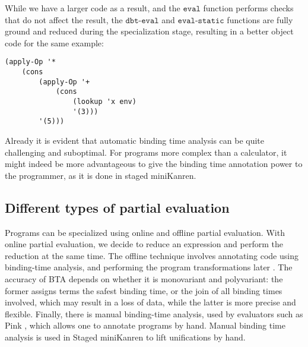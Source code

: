 \documentclass[11pt]{article}
\theoremstyle{definition}
\newcommand{\code}[1]{\texttt{#1}}
\newcommand\tab[1][1cm]{\hspace*{#1}}
\begin{document}
\tab While we have a larger code as a result, and the $\code{eval}$ function performs checks that do not affect the result, the $\code{dbt-eval}$ and $\code{eval-static}$ functions are fully ground and reduced during the specialization stage, resulting in a better object code for the same example:
\begin{lstlisting}
(apply-Op '*
    (cons
        (apply-Op '+
            (cons
                (lookup 'x env)
                '(3)))
        '(5)))
\end{lstlisting}
\tab Already it is evident that automatic binding time analysis can be quite challenging and suboptimal. For programs more complex than a calculator, it might indeed be more advantageous to give the binding time annotation power to the programmer, as it is done in staged miniKanren.
\subsection{Different types of partial evaluation}
Programs can be specialized using online and offline partial evaluation. With online partial evaluation, we decide to reduce an expression and perform the reduction at the same time. The offline technique involves annotating code using binding-time analysis, and performing the program transformations later \cite{christensen2004offline}. The accuracy of BTA depends on whether it is monovariant and polyvariant: the former assigns terms the safest binding time, or the join of all binding times involved, which may result in a loss of data, while the latter is more precise and flexible.
Finally, there is manual binding-time analysis, used by evaluators such as Pink \cite{amin2017collapsing}, which allows one to annotate programs by hand. Manual binding time analysis is used in Staged miniKanren to lift unifications by hand.
\end{document}

